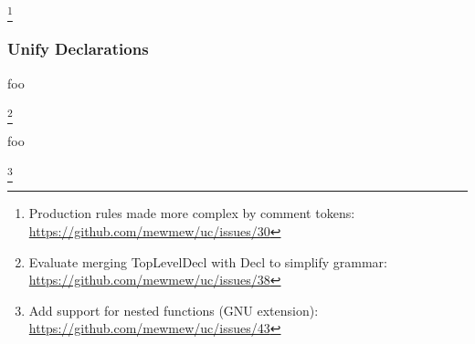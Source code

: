 \footnote{Production rules made more complex by comment tokens: \url{https://github.com/mewmew/uc/issues/30}}

\subsubsection{Unify Declarations}




foo

\footnote{Evaluate merging TopLevelDecl with Decl to simplify grammar: \url{https://github.com/mewmew/uc/issues/38}}

foo

%
%
%
%
%
%
%


\footnote{Add support for nested functions (GNU extension): \url{https://github.com/mewmew/uc/issues/43}}

